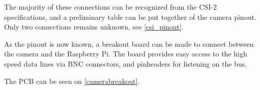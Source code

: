 The majority of these connections can be recognized from the CSI-2 specifications, and a preliminary table can be put together of the camera pinout. Only two connections remains unknown, see \autoref{csi_pinout}.
\begin{table}[H]
\centering 
{}
\caption{Camera pinout}
\label{csi_pinout}
\end{table}

As the pinout is now known, a breakout board can be made to connect between the camera and the Raspberry Pi. The board provides easy access to the high speed data lines via BNC connectors, and pinheaders for listening on the \iic bus.

The PCB can be seen on \autoref{camerabreakout}.

